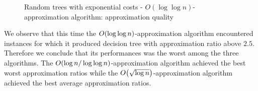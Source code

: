 \begin{figure}[ht]
\centering
{}
\caption{Random trees with exponential costs - $O(\log \log n)$-approximation algorithm: approximation quality}
\label{fig:random_c_exponential_kup}
\end{figure}
\FloatBarrier
We observe that this time the $O\mathopen{}\left( \log \log n \right)$-approximation algorithm encountered instances for which it produced decision tree with approximation ratio above $2.5$. Therefore we conclude that its performances was the worst among the three algorithms. The $O\mathopen{}\left( \log n/\log \log n \right)$-approximation algorithm achieved the best worst approximation ratios while the $O\mathopen{}\left( \sqrt{\log n} \right)$-approximation algorithm achieved the best average approximation ratios.

